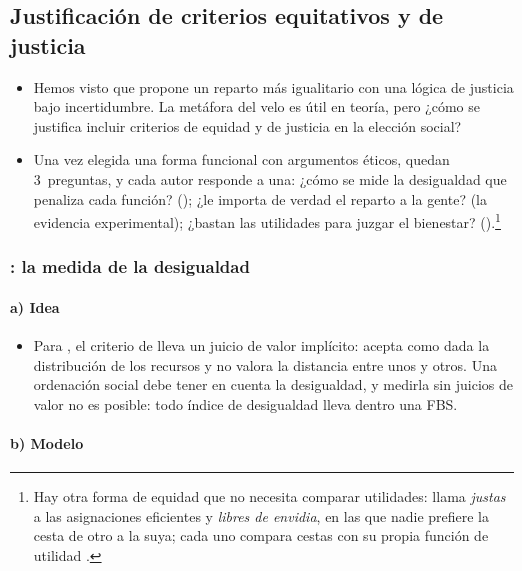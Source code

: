 \documentclass[11pt]{article}
\begin{document}
\subsection{Justificación de criterios equitativos y de justicia}\label{sec:criterios-equitativos}

\begin{itemize}
\item Hemos visto que  propone un reparto más igualitario con una lógica de justicia bajo incertidumbre. La metáfora del velo es útil en teoría, pero ¿cómo se justifica incluir criterios de equidad y de justicia en la elección social?
\item Una vez elegida una forma funcional con argumentos éticos, quedan 3~preguntas, y cada autor responde a una: ¿cómo se mide la desigualdad que penaliza cada función? (); ¿le importa de verdad el reparto a la gente? (la evidencia experimental); ¿bastan las utilidades para juzgar el bienestar? ().\footnote{Hay otra forma de equidad que no necesita comparar utilidades: \textcite{Foley1967Resource} llama \emph{justas} a las asignaciones eficientes y \emph{libres de envidia}, en las que nadie prefiere la cesta de otro a la suya; cada uno compara cestas con su propia función de utilidad  .}
\end{itemize}

\subsubsection{: la medida de la desigualdad}\label{sec:atkinson}

\paragraph{a) Idea}

\begin{itemize}
\item Para , el criterio de  lleva un juicio de valor implícito: acepta como dada la distribución de los recursos y no valora la distancia entre unos y otros. Una ordenación social debe tener en cuenta la desigualdad, y medirla sin juicios de valor no es posible: todo índice de desigualdad lleva dentro una FBS\nocite{Atkinson1970Measurement}.
\end{itemize}

\paragraph{b) Modelo}
\end{document}
